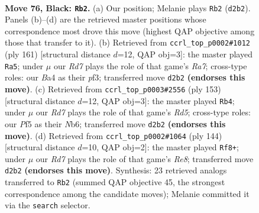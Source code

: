 \documentclass[11pt]{article}
\begin{document}
\clearpage

\begin{figure}[p]\centering
\begin{subfigure}{0.46\textwidth}\centering
\resizebox{\linewidth}{!}{%
\newchessgame
\chessboard[
  setfen={8/p7/P6k/5p2/b4P2/8/3r4/4R1K1 b - - 3 76},
  showmover=false,
  pgfstyle=straightmove, color=movearrow, markmove={d2-b2}
]}
\caption{}
\end{subfigure}\hfill
\begin{subfigure}{0.46\textwidth}\centering
\resizebox{\linewidth}{!}{%
\newchessgame
\chessboard[
  setfen={6k1/8/6p1/6Pp/1R1K3P/5P2/r7/8 b - - 51 81},
  showmover=false,
  pgfstyle=straightmove, color=movearrow, markmove={a2-a5}
]}
\caption{}
\end{subfigure}
\\[4pt]
\begin{subfigure}{0.46\textwidth}\centering
\resizebox{\linewidth}{!}{%
\newchessgame
\chessboard[
  setfen={5k2/8/1n6/1P4p1/3r4/4R1KP/2B5/8 b - - 3 77},
  showmover=false,
  pgfstyle=straightmove, color=movearrow, markmove={d4-b4}
]}
\caption{}
\end{subfigure}\hfill
\begin{subfigure}{0.46\textwidth}\centering
\resizebox{\linewidth}{!}{%
\newchessgame
\chessboard[
  setfen={4R3/8/r4k2/8/5p2/2P3p1/6P1/5K2 w - - 18 73},
  showmover=false,
  pgfstyle=straightmove, color=movearrow, markmove={e8-f8}
]}
\caption{}
\end{subfigure}
\caption{\textbf{Move 76, Black: \texttt{Rb2}.} (a) Our position; Melanie plays \texttt{Rb2} (\texttt{d2b2}). Panels (b)--(d) are the retrieved master positions whose correspondence most drove this move (highest QAP objective among those that transfer to it). (b) Retrieved from \texttt{ccrl\_top\_p0002\#1012} (ply 161) [structural distance $d$=12, QAP obj=3]: the master played \texttt{Ra5}; under $\mu$ our \emph{Rd7} plays the role of that game's \emph{Ra7}; cross-type roles: our \emph{B}a4 as their \emph{p}f3; transferred move \texttt{d2b2} \textbf{(endorses this move)}. (c) Retrieved from \texttt{ccrl\_top\_p0003\#2556} (ply 153) [structural distance $d$=12, QAP obj=3]: the master played \texttt{Rb4}; under $\mu$ our \emph{Rd7} plays the role of that game's \emph{Rd5}; cross-type roles: our \emph{P}f5 as their \emph{N}b6; transferred move \texttt{d2b2} \textbf{(endorses this move)}. (d) Retrieved from \texttt{ccrl\_top\_p0002\#1064} (ply 144) [structural distance $d$=10, QAP obj=2]: the master played \texttt{Rf8+}; under $\mu$ our \emph{Rd7} plays the role of that game's \emph{Re8}; transferred move \texttt{d2b2} \textbf{(endorses this move)}. Synthesis: 23 retrieved analogs transferred to \texttt{Rb2} (summed QAP objective 45, the strongest correspondence among the candidate moves); Melanie committed it via the \texttt{search} selector.}
\label{fig:thought-m151}
\end{figure}
\end{document}

